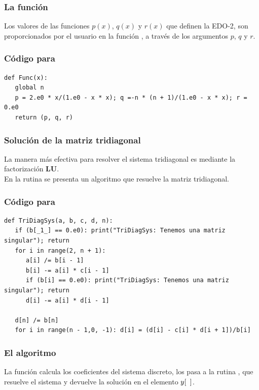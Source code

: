 \begin{frame}
\frametitle{La función \texttt{}}
Los valores de las funciones $p(x)$, $q(x)$ y $r(x)$ que definen la EDO-2, son proporcionados por el usuario en la función , a través de los argumentos $p$, $q$ y $r$.
\end{frame}
\begin{frame}
\frametitle{Código para }
\begin{lstlisting}[caption=Código para Func, style=FormattedNumber, basicstyle=\linespread{1.1}\ttfamily=\small, columns=fullflexible]
def Func(x):
   global n
   p = 2.e0 * x/(1.e0 - x * x); q =-n * (n + 1)/(1.e0 - x * x); r = 0.e0
   return (p, q, r)
\end{lstlisting}
\end{frame}
\begin{frame}
\frametitle{Solución de la matriz tridiagonal}
La manera más efectiva para resolver el sistema tridiagonal es mediante la factorización \textbf{LU}.
\\
\bigskip
En la rutina  se presenta un algoritmo que resuelve la matriz tridiagonal.
\end{frame}
\begin{frame}
\frametitle{Código para }
\begin{lstlisting}[caption=Función TriDiagSys, style=FormattedNumber, basicstyle=\linespread{1.1}\ttfamily=\small, columns=fullflexible]
def TriDiagSys(a, b, c, d, n):
   if (b[_1_] == 0.e0): print("TriDiagSys: Tenemos una matriz singular"); return
   for i in range(2, n + 1):
      a[i] /= b[i - 1]
      b[i] -= a[i] * c[i - 1]
      if (b[i] == 0.e0): print("TriDiagSys: Tenemos una matriz singular"); return
      d[i] -= a[i] * d[i - 1]

   d[n] /= b[n]
   for i in range(n - 1,0, -1): d[i] = (d[i] - c[i] * d[i + 1])/b[i]
\end{lstlisting}
\end{frame}
\begin{frame}
\frametitle{El algoritmo}
La función  calcula los coeficientes del sistema discreto, los pasa a la rutina , que resuelve el sistema y devuelve la solución en el elemento $y[\enskip]$.
\end{frame}
